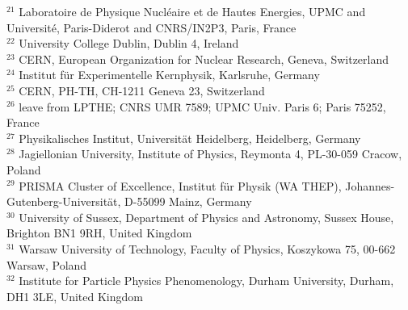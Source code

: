 { $ ^{21}$ Laboratoire de Physique Nucl\' eaire et de Hautes Energies, UPMC and Universit\'e, Paris-Diderot and CNRS/IN2P3, Paris, France \\
 $ ^{22}$ University College Dublin, Dublin 4, Ireland \\
 $ ^{23}$ CERN, European Organization for Nuclear Research, Geneva, Switzerland \\
 $ ^{24}$ Institut f\" ur Experimentelle Kernphysik, Karlsruhe, Germany \\
 $ ^{25}$ CERN, PH-TH, CH-1211 Geneva 23, Switzerland \\
 $ ^{26}$ leave from LPTHE; CNRS UMR 7589; UPMC Univ. Paris 6; Paris 75252, France \\
 $ ^{27}$ Physikalisches Institut, Universit\"at Heidelberg, Heidelberg, Germany \\
 $ ^{28}$ Jagiellonian University, Institute of Physics, Reymonta 4, PL-30-059 Cracow, Poland \\
 $ ^{29}$ PRISMA Cluster of Excellence, Institut f\"ur Physik (WA THEP), Johannes-Gutenberg-Universit\" at, D-55099 Mainz, Germany \\
 $ ^{30}$ University of Sussex, Department of Physics and Astronomy, Sussex House, Brighton BN1 9RH, United Kingdom \\
 $ ^{31}$ Warsaw University of Technology, Faculty of Physics, Koszykowa 75, 00-662 Warsaw, Poland \\
 $ ^{32}$ Institute for Particle Physics Phenomenology, Durham University, Durham, DH1 3LE, United Kingdom \\
}
%
